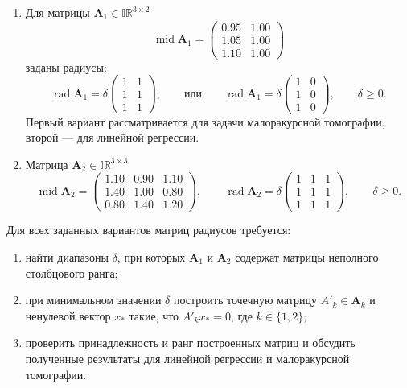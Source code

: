 \documentclass[12pt,a4paper]{article}
\numberwithin{equation}{section}
\begin{document}
\begin{enumerate}
    \setlength{\itemsep}{0.8\baselineskip}

    \item Для матрицы $\boldsymbol{A}_1\in\mathbb{IR}^{3\times2}$
    \[
        \operatorname{mid}\boldsymbol{A}_1=
        \begin{pmatrix}
            0.95 & 1.00 \\
            1.05 & 1.00 \\
            1.10 & 1.00
        \end{pmatrix}
    \]
    заданы радиусы:
    \[
        \operatorname{rad}\boldsymbol{A}_1=\delta
        \begin{pmatrix}
            1 & 1 \\
            1 & 1 \\
            1 & 1
        \end{pmatrix},
        \qquad\text{или}\qquad
        \operatorname{rad}\boldsymbol{A}_1=\delta
        \begin{pmatrix}
            1 & 0 \\
            1 & 0 \\
            1 & 0
        \end{pmatrix},
        \qquad \delta\geq0.
    \]
    Первый вариант рассматривается для задачи малоракурсной томографии,
    второй --- для линейной регрессии.

    \item Матрица $\boldsymbol{A}_2\in\mathbb{IR}^{3\times3}$
    \[
        \operatorname{mid}\boldsymbol{A}_2=
        \begin{pmatrix}
            1.10 & 0.90 & 1.10 \\
            1.40 & 1.00 & 0.80 \\
            0.80 & 1.40 & 1.20
        \end{pmatrix},
        \qquad
        \operatorname{rad}\boldsymbol{A}_2=\delta
        \begin{pmatrix}
            1 & 1 & 1 \\
            1 & 1 & 1 \\
            1 & 1 & 1
        \end{pmatrix},
        \qquad \delta\geq0.
    \]
\end{enumerate}

Для всех заданных вариантов матриц радиусов требуется:
\begin{enumerate}
    \item найти диапазоны $\delta$, при которых $\boldsymbol{A}_1$ и
    $\boldsymbol{A}_2$ содержат матрицы неполного столбцового ранга;
    \item при минимальном значении $\delta$ построить точечную матрицу
    $A'_k\in\boldsymbol{A}_k$ и ненулевой вектор $x_*$ такие, что
    $A'_kx_*=0$, где $k\in\{1,2\}$;
    \item проверить принадлежность и ранг построенных матриц и обсудить
    полученные результаты для линейной регрессии и малоракурсной томографии.
\end{enumerate}
\end{document}
